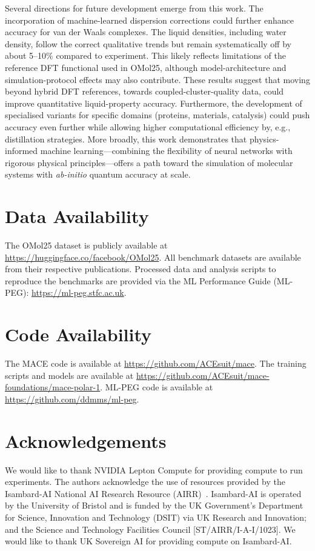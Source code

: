 \documentclass[aps,%
superscriptaddress,
 amsmath,amssymb,
floatfix,
twocolumn
]{revtex4-2}
\begin{document}
%
Several directions for future development emerge from this work. The incorporation of machine-learned dispersion corrections could further enhance accuracy for van der Waals complexes. The liquid densities, including water density, follow the correct qualitative trends but remain systematically off by about 5--10\% compared to experiment. This likely reflects limitations of the reference DFT functional used in OMol25, although model-architecture and simulation-protocol effects may also contribute. These results suggest that moving beyond hybrid DFT references, towards coupled-cluster-quality data, could improve quantitative liquid-property accuracy. Furthermore, the development of specialised variants for specific domains (proteins, materials, catalysis) could push accuracy even further while allowing higher computational efficiency by, e.g., distillation strategies.
%
More broadly, this work demonstrates that physics-informed machine learning—combining the flexibility of neural networks with rigorous physical principles—offers a path toward the simulation of molecular systems with \textit{ab-initio} quantum accuracy at scale.


\section*{Data Availability}

The OMol25 dataset is publicly available at \url{https://huggingface.co/facebook/OMol25}. All benchmark datasets are available from their respective publications. Processed data and analysis scripts to reproduce the benchmarks are provided via the ML Performance Guide (ML-PEG):  \url{https://ml-peg.stfc.ac.uk}.

\section*{Code Availability}

The MACE code is available at \url{https://github.com/ACEsuit/mace}.
The training scripts and models are available at \url{https://github.com/ACEsuit/mace-foundations/mace-polar-1}. ML-PEG code is available at \url{https://github.com/ddmms/ml-peg}.

\section*{Acknowledgements}
 
We would like to thank NVIDIA Lepton Compute for providing compute
to run experiments.
The authors acknowledge the use of resources provided by the Isambard-AI National AI Research Resource (AIRR)~\cite{bristol-ai}. Isambard-AI is operated by the University of Bristol and is funded by the UK Government’s Department for Science, Innovation and Technology (DSIT) via UK Research and Innovation; and the Science and Technology Facilities Council [ST/AIRR/I-A-I/1023].
We would like to thank UK Sovereign AI for providing compute on Isambard-AI.
\end{document}
